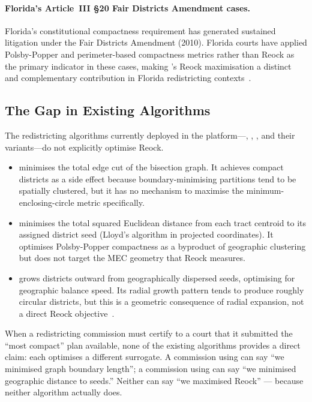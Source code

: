 \paragraph{Florida's Article~III \S20 Fair Districts Amendment cases.}
Florida's constitutional compactness requirement has generated sustained
litigation under the Fair Districts Amendment (2010).
Florida courts have applied Polsby-Popper and perimeter-based compactness
metrics rather than Reock as the primary indicator in these cases,
making \mka{}'s Reock maximisation a distinct and complementary contribution
in Florida redistricting contexts~\citep{floridaConst}.

\subsection{The Gap in Existing Algorithms}

The redistricting algorithms currently deployed in the platform---\metis{},
\cvdgeo{}, \bfsg{}, and their variants---do not explicitly optimise Reock.

\begin{itemize}
\item \metis{} minimises the total edge cut of the bisection graph.
  It achieves compact districts as a side effect because boundary-minimising
  partitions tend to be spatially clustered, but it has no mechanism to
  maximise the minimum-enclosing-circle metric specifically.

\item \cvdgeo{} minimises the total squared Euclidean distance from each tract
  centroid to its assigned district seed (Lloyd's algorithm in projected
  coordinates).
  It optimises Polsby-Popper compactness as a byproduct of geographic
  clustering but does not target the MEC geometry that Reock measures.

\item \bfsg{} grows districts outward from geographically dispersed seeds,
  optimising for geographic balance speed.
  Its radial growth pattern tends to produce roughly circular districts,
  but this is a geometric consequence of radial expansion, not a direct
  Reock objective~\citep{dellaLibera2026bfs}.
\end{itemize}

When a redistricting commission must certify to a court that it submitted
the ``most compact'' plan available, none of the existing algorithms provides
a direct claim: each optimises a different surrogate.
A commission using \metis{} can say ``we minimised graph boundary length'';
a commission using \cvdgeo{} can say ``we minimised geographic distance to seeds.''
Neither can say ``we maximised Reock'' --- because neither algorithm actually does.

